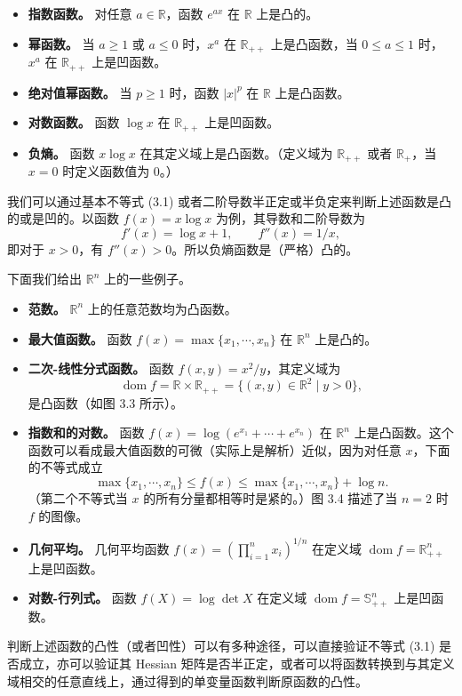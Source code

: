 \documentclass[UTF8,12pt,a4paper,fontset=fandol]{ctexart}
\DeclareMathOperator{\dom}{dom}
\begin{document}
\begin{itemize}
\item \textbf{指数函数。} 对任意 $a\in\mathbb{R}$，函数 $e^{ax}$ 在 $\mathbb{R}$ 上是凸的。
\item \textbf{幂函数。} 当 $a\geq1$ 或 $a\leq0$ 时，$x^a$ 在 $\mathbb{R}_{++}$ 上是凸函数，当 $0\leq a\leq1$ 时，$x^a$ 在 $\mathbb{R}_{++}$ 上是凹函数。
\item \textbf{绝对值幂函数。} 当 $p\geq1$ 时，函数 $|x|^p$ 在 $\mathbb{R}$ 上是凸函数。
\item \textbf{对数函数。} 函数 $\log x$ 在 $\mathbb{R}_{++}$ 上是凹函数。
\item \textbf{负熵。} 函数 $x\log x$ 在其定义域上是凸函数。（定义域为 $\mathbb{R}_{++}$ 或者 $\mathbb{R}_+$，当 $x=0$ 时定义函数值为 0。）
\end{itemize}

我们可以通过基本不等式 (3.1) 或者二阶导数半正定或半负定来判断上述函数是凸的或是凹的。以函数 $f(x)=x\log x$ 为例，其导数和二阶导数为
\[
f'(x)=\log x+1,\qquad f''(x)=1/x,
\]
即对于 $x>0$，有 $f''(x)>0$。所以负熵函数是（严格）凸的。

下面我们给出 $\mathbb{R}^n$ 上的一些例子。

\begin{itemize}
\item \textbf{范数。} $\mathbb{R}^n$ 上的任意范数均为凸函数。
\item \textbf{最大值函数。} 函数 $f(x)=\max\{x_1,\cdots,x_n\}$ 在 $\mathbb{R}^n$ 上是凸的。
\item \textbf{二次-线性分式函数。} 函数 $f(x,y)=x^2/y$，其定义域为
\[
\dom f=\mathbb{R}\times\mathbb{R}_{++}=\{(x,y)\in\mathbb{R}^2\mid y>0\},
\]
是凸函数（如图 3.3 所示）。
\item \textbf{指数和的对数。} 函数 $f(x)=\log(e^{x_1}+\cdots+e^{x_n})$ 在 $\mathbb{R}^n$ 上是凸函数。这个函数可以看成最大值函数的可微（实际上是解析）近似，因为对任意 $x$，下面的不等式成立
\[
\max\{x_1,\cdots,x_n\}\leq f(x)\leq \max\{x_1,\cdots,x_n\}+\log n.
\]
（第二个不等式当 $x$ 的所有分量都相等时是紧的。）图 3.4 描述了当 $n=2$ 时 $f$ 的图像。
\item \textbf{几何平均。} 几何平均函数 $f(x)=\left(\prod_{i=1}^n x_i\right)^{1/n}$ 在定义域 $\dom f=\mathbb{R}_{++}^n$ 上是凹函数。
\item \textbf{对数-行列式。} 函数 $f(X)=\log\det X$ 在定义域 $\dom f=\mathbb{S}_{++}^n$ 上是凹函数。
\end{itemize}

判断上述函数的凸性（或者凹性）可以有多种途径，可以直接验证不等式 (3.1) 是否成立，亦可以验证其 Hessian 矩阵是否半正定，或者可以将函数转换到与其定义域相交的任意直线上，通过得到的单变量函数判断原函数的凸性。
\end{document}
